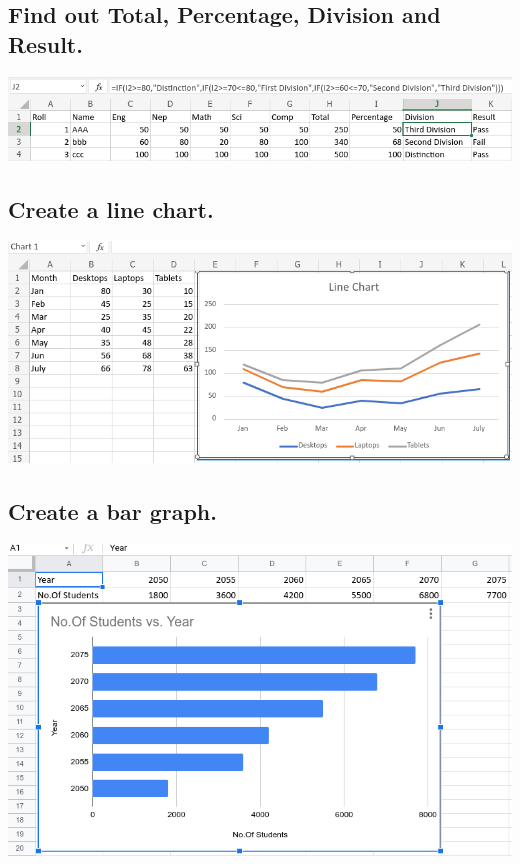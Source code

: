 \documentclass[17pt,a4paper,oneside,margin=1in]{article}
\begin{document}
\subsection{Find out Total, Percentage, Division and Result.}
\includegraphics[width=1\textwidth]{./scrot/spreadsheet-2.png}

\subsection{Create a line chart.}
\includegraphics[width=1\textwidth]{./scrot/spreadsheet-3.png}

\subsection{Create a bar graph.}
\includegraphics[width=1\textwidth]{./scrot/spreadsheet-4.png}
\end{document}
